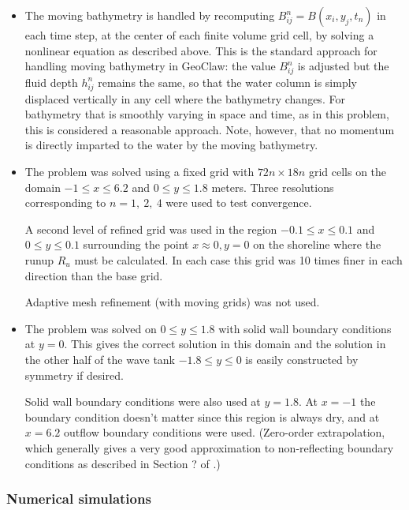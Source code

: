 \begin{itemize}
\item  The moving bathymetry is handled by recomputing $B_{ij}^n =
B(x_i,y_j,t_n)$ in
each time step, at the center of each finite volume grid cell, by solving a
nonlinear equation as described above.  This is the standard approach
for handling moving bathymetry in GeoClaw:  the value $B_{ij}^n$ is adjusted
but the fluid depth $h_{ij}^n$ remains the same, so that the water column is
simply displaced vertically in any cell where the bathymetry changes.  For
bathymetry that is smoothly varying  in space and time, as in this problem,
this is considered a reasonable approach.  Note, however, that no momentum
is directly imparted to the water by the moving bathymetry.  

\item The problem was solved using a fixed grid with $72n \times 18n$ grid
cells on the domain $-1\leq x \leq 6.2$ and $0\leq y \leq 1.8$ meters.
Three resolutions corresponding to $n=1,~2,~4$ were used to test
convergence.

A second level of refined grid was used in the region $-0.1\leq x \leq 0.1$
and $0\leq y \leq 0.1$ surrounding the point $x\approx 0, y=0$
on the shoreline where the runup $R_u$ must be calculated.  In each case
this grid was 10 times finer in each direction than the base grid.  

Adaptive mesh refinement (with moving grids) was not used.

\item The problem was solved on $0\leq y \leq 1.8$ with solid wall boundary
conditions at $y=0$.  This gives the correct solution in this
domain and the solution in the other half of the wave tank $-1.8\leq y\leq
0$  is easily constructed by symmetry if desired.

Solid wall boundary conditions were also used at $y=1.8$.  At $x=-1$ the
boundary condition doesn't matter since this region is always dry, and at
$x=6.2$ outflow boundary conditions were used.  (Zero-order extrapolation,
which generally gives a very good approximation to non-reflecting boundary
conditions as described in Section ? of \cite{rjl:fvmhp}.)


\end{itemize} 


\subsubsection{Numerical simulations}

